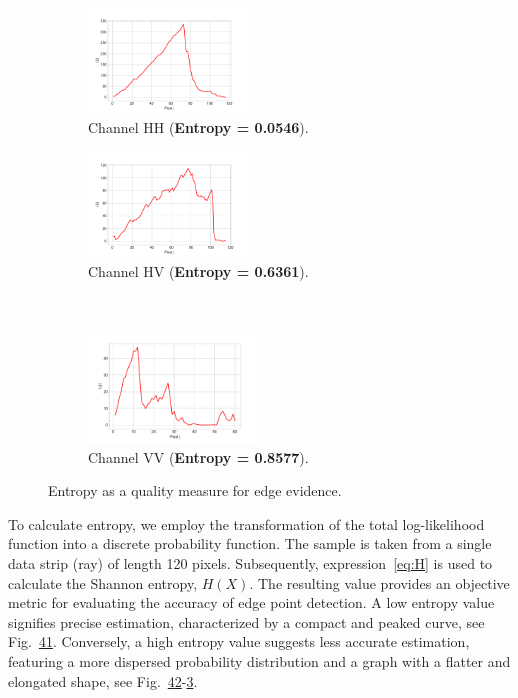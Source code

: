 \documentclass{article}
\begin{document}
\begin{figure}[H]
\captionsetup[subfigure]{justification=centering}
   \centering
    \begin{subfigure}{0.49\linewidth}
    \includegraphics[width=4.2cm]{figures/likelihood_hh.pdf}
    \caption{\scriptsize{Channel HH (\textbf{Entropy = 0.0546}).}}
    \label{subfig:1en}
  \end{subfigure}
  \begin{subfigure}{0.49\linewidth}
    \includegraphics[width=4.2cm]{figures/likelihood_hv.pdf}
 \caption{\scriptsize{Channel HV (\textbf{Entropy =  0.6361}).}}
    \label{subfig:2en}
  \end{subfigure}\\
   \begin{subfigure}{0.6\linewidth}
    \includegraphics[width=4.5cm]{figures/likelihood_vv.pdf}
   \caption{\scriptsize{Channel VV (\textbf{Entropy = 0.8577}).}}
    \label{subfig:3en}
  \end{subfigure}
  \label{fig:1}
  \caption{Entropy as a quality measure for edge evidence.}
  \label{fig:entropy1}
\end{figure}
To calculate entropy,  we employ the transformation of the total log-likelihood function into a discrete probability function. The sample is taken from a single data strip (ray) of length 120 pixels.  Subsequently, expression~\eqref{eq:H} is used to calculate the Shannon entropy, $H(X)$. The resulting value provides an objective metric for evaluating the accuracy of edge point detection. A low entropy value signifies precise estimation, characterized by a compact and peaked curve, see Fig.~\ref{fig:entropy1}\ref{subfig:1en}. Conversely, a high entropy value suggests less accurate estimation, featuring a more dispersed probability distribution and a graph with a flatter and elongated shape, see Fig.~\ref{fig:entropy1}\ref{subfig:2en}-\ref{subfig:3en}.
\end{document}
